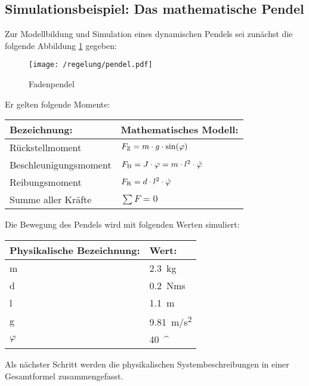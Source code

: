\subsection{Simulationsbeispiel: Das mathematische Pendel}

Zur Modellbildung und Simulation eines dynamischen Pendels sei zunächst die folgende Abbildung \ref{fig:pendel} gegeben:

\begin{figure}[h]
	\centering
	\texttt{[image: /regelung/pendel.pdf]}
	\label{fig:pendel}
	\caption{Fadenpendel}
\end{figure}

Er gelten folgende Momente:

\begin{center}
	\begin{tabular}{ll}
		\toprule
		Bezeichnung:				&	Mathematisches Modell: \\
		\midrule
		Rückstellmoment				&	$F_\i{Z} = m \cdot g \cdot \si{sin}(\varphi) \label{rueckstellmoment}$ \\
		Beschleunigungsmoment		&	$F_\i{B} = J \cdot \varphi = m \cdot l^{2} \cdot \ddot\varphi\label{beschleunigungsmoment} $ \\
		Reibungsmoment				&	$F_\i{R} = d \cdot l^{2} \cdot \dot\varphi\label{reibungsmoment} $ \\
		Summe aller Kräfte			&	$\sum F = 0 \label{momentengleichgewicht} $ \\
		\bottomrule 
	\end{tabular}
\end{center}
		
Die Bewegung des Pendels wird mit folgenden Werten simuliert:

\begin{center}
	\begin{tabular}{ll}
		\toprule
		Physikalische Bezeichnung:	& Wert: \\
		\midrule
		m		& \SI{2,3}{kg} \\
		d		& \SI{0,2}{Nms} \\
		l		& \SI{1,1}{m} \\
		g		& \SI{9,81}{m/s^2}\\
		$\varphi$ & \SI{40}{^\circ}\\
		\bottomrule
	\end{tabular}
\end{center}
	
Als nächster Schritt werden die physikalischen Systembeschreibungen in einer Gesamtformel zusammengefasst. 

